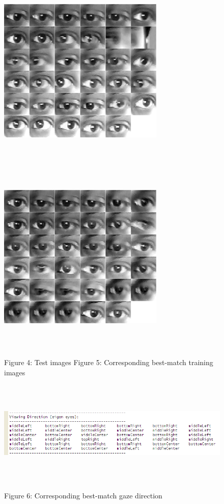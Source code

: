 \documentclass[12pt,letterpaper]{article}
\begin{document}
\begin{figure}[h]
\includegraphics[width=79mm,height=95mm]{testImg.png}
\hfill
\includegraphics[width=79mm,height=95mm]{matchImg.png}

\small \quad\qquad\qquad\qquad\qquad Figure 4: Test images \qquad\qquad\qquad
\small Figure 5: Corresponding best-match training images
\end{figure}

\begin{figure}[h]
\centering
\includegraphics[width=170mm,height=50mm]{viewingDir.png}

\small Figure 6: Corresponding best-match gaze direction
\end{figure}
\end{document}
